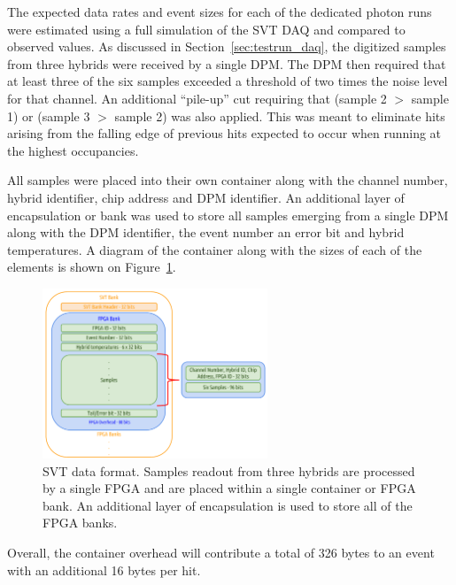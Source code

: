 
%
%

The expected data rates and event sizes for each of the dedicated photon runs
were estimated using a full simulation of the SVT DAQ and compared to observed
values. As discussed in Section~\ref{sec:testrun_daq}, the digitized samples
from three hybrids were received by a single DPM.  The DPM then required that
at least three of the six samples exceeded a threshold of two times the noise
level for that channel.  An additional ``pile-up'' cut requiring that 
(sample 2 $>$ sample 1) or (sample 3 $>$ sample 2) was also applied. This was
meant to eliminate hits arising from the falling edge of previous hits expected
to occur when running at the highest occupancies.

All samples were placed into their own container along with the 
channel number, hybrid identifier, chip address and DPM identifier. An 
additional layer of encapsulation or bank was used to store all samples 
emerging from a single DPM along with the DPM identifier, the event number
an error bit and hybrid temperatures. A diagram of the container along with
the sizes of each of the elements is shown on Figure~\ref{fig:data_format}.
\begin{figure}[h]
    \begin{center}
    	\includegraphics[width=0.60\textwidth]{test2012/svtperformance/daq_performance/svt_data_format.pdf}
        \caption{
                    SVT data format. Samples readout from three hybrids are 
                    processed by a single FPGA and are placed within a single
                    container or FPGA bank.  An additional layer of 
                    encapsulation is used to store all of the FPGA banks.
                 } 
	\label{fig:data_format}
    \end{center}
\end{figure}
Overall, the container overhead will contribute a total of 326 bytes to an event
with an additional 16 bytes per hit.

